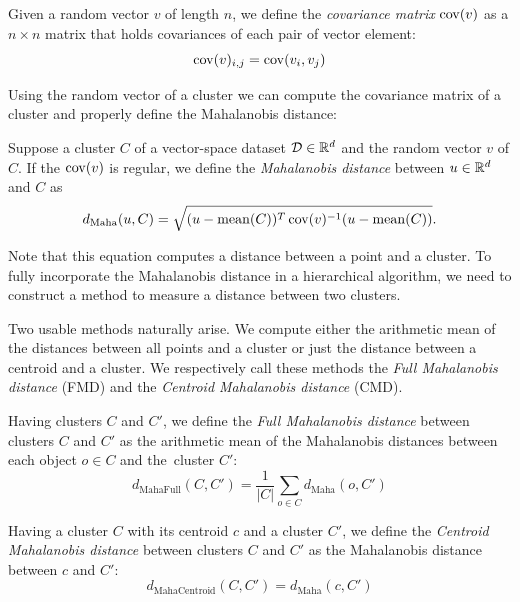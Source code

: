 \begin{defn}
	Given a random vector $v$ of length $n$, we define the \emph{covariance matrix} $\operatorname{cov}(v)$ as a $n\times n$ matrix that holds covariances of each pair of vector element:
	$$\operatorname{cov}(v)_{i,j}=\operatorname{cov}(v_i,v_j)$$
\end{defn}

Using the random vector of a cluster we can compute the covariance matrix of a cluster and properly define the Mahalanobis distance:

\begin{defn}
	Suppose a cluster $C$ of a vector-space dataset $\mathcal{D}\in\mathbb{R}^d$ and the random vector $v$ of $C$. If the $\operatorname{cov}(v)$ is regular, we define the \emph{Mahalanobis distance} between $u \in \mathbb{R}^d$ and $C$ as
	\begin{equation}
	d_\text{Maha}(u,C) = \sqrt{(u-\operatorname{mean}(C))^T\operatorname{cov}(v)^{-1}(u-\operatorname{mean}(C))}.
	\end{equation}\label{eq01:maha}
\end{defn}

Note that this equation computes a distance between a point and a cluster. To fully incorporate the Mahalanobis distance in a hierarchical algorithm, we need to construct a method to measure a distance between two clusters.

Two usable methods naturally arise. We compute either the arithmetic mean of the distances between all points and a cluster or just the distance between a centroid and a cluster. We respectively call these methods the \emph{Full Mahalanobis distance} (FMD) and the \emph{Centroid Mahalanobis distance} (CMD).

\begin{defn}
	Having clusters $C$ and $C'$, we define the \emph{Full Mahalanobis distance} between clusters $C$ and $C'$ as the arithmetic mean of the Mahalanobis distances between each object $o \in C$ and the~cluster $C'$:
	$$d_\text{MahaFull}(C,C') =\frac{1}{|C|}\sum_{o\in C}{d_\text{Maha}(o,C')}$$
	\label{def01:fmd}
\end{defn}

\begin{defn}
	Having a cluster $C$ with its centroid $c$ and a cluster $C'$, we define the \emph{Centroid Mahalanobis distance} between clusters $C$ and $C'$ as the Mahalanobis distance between $c$ and $C'$:
	$$d_\text{MahaCentroid}(C,C')=d_\text{Maha}(c,C')$$
	\label{def01:cmd}
\end{defn}


